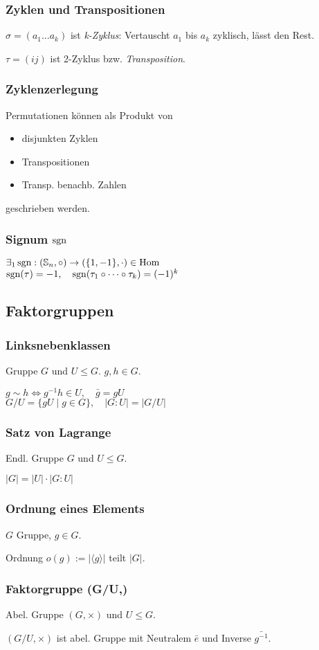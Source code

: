 \subsubsection*{Zyklen und Transpositionen}
$\sigma = (a_1 \dots a_k)$ ist \textit{k-Zyklus}:
Vertauscht $a_1$ bis $a_k$ zyklisch, lässt den Rest.

$\tau  = (i j)$ ist 2-Zyklus bzw. \textit{Transposition}.

\subsubsection*{Zyklenzerlegung}
Permutationen können als Produkt von
\begin{itemize}
	\item disjunkten Zyklen
	\item Transpositionen
	\item Transp. benachb. Zahlen
\end{itemize}
geschrieben werden.

\subsubsection*{Signum $\operatorname{sgn}$}
$\exists_1 \operatorname{sgn} : (\mathbb{S}_n, \circ) \to (\{1,-1\},\cdot) \in \operatorname{Hom}$ \\
$\operatorname{sgn}(\tau)=-1, \quad \operatorname{sgn}(\tau_1 \circ \dots \circ \tau_k)=(-1)^k$

\subsection*{Faktorgruppen}

\subsubsection*{Linksnebenklassen}
Gruppe $G$ und $U\le G$. $g,h\in G$.

$ g \sim h \iff g^{-1}h\in U,\quad \bar g = gU$\\
$ G/U = \{gU \mid g \in G \}, \quad |G:U| = |G/U| $

\subsubsection*{Satz von Lagrange}
Endl. Gruppe $G$ und $U \le G$.

$|G| = |U|\cdot|G:U|$

\subsubsection*{Ordnung eines Elements}
$G$ Gruppe, $g\in G$.

Ordnung $o(g):=|\langle g \rangle|$ teilt $|G|$.

\subsubsection*{Faktorgruppe (G/U,\times)}
Abel. Gruppe $(G,\times)$ und $U \le G$.

$(G/U,\times)$ ist abel. Gruppe mit
Neutralem $\bar e$ und Inverse $\bar{g^{-1}}$.
